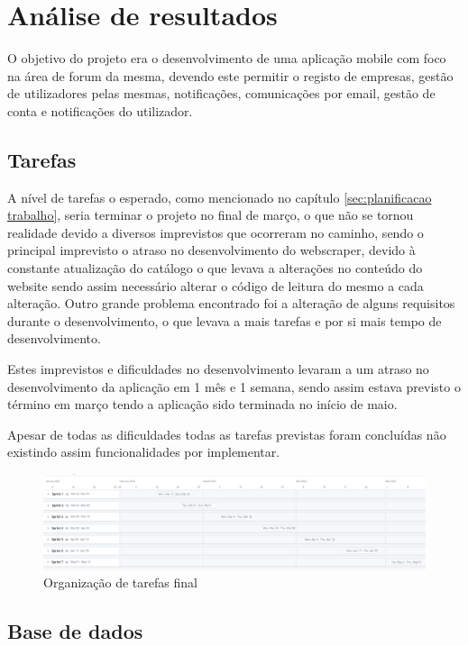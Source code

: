 \chapter{Análise de resultados}
 O objetivo do projeto era o desenvolvimento de uma aplicação mobile com foco na área de forum da mesma, devendo este permitir o registo de empresas, gestão de utilizadores pelas mesmas, notificações, comunicações por email, gestão de conta e notificações do utilizador.

 \section{Tarefas}

A nível de tarefas o esperado, como mencionado no capítulo \ref{sec:planificacao trabalho}, seria terminar o projeto no final de março, o que não se tornou realidade devido a diversos imprevistos que ocorreram no caminho, sendo o principal imprevisto o atraso no desenvolvimento do webscraper, devido à constante atualização do catálogo o que levava a alterações no conteúdo do website sendo assim necessário alterar o código de leitura do mesmo a cada alteração. Outro grande problema encontrado foi a alteração de alguns requisitos durante o desenvolvimento, o que levava a mais tarefas e por si mais tempo de desenvolvimento.

Estes imprevistos e dificuldades no desenvolvimento levaram a um atraso no desenvolvimento da aplicação em 1 mês e 1 semana, sendo assim estava previsto o término em março tendo a aplicação sido terminada no início de maio.

Apesar de todas as dificuldades todas as tarefas previstas foram concluídas não existindo assim funcionalidades por implementar.

\begin{figure}[htb]
  \centering
  \includegraphics[width=\textwidth]{images/analise_resultados/planeamento_final.png}
  \caption{Organização de tarefas final}
  \label{fig:77}
\end{figure}

\newpage

\section{Base de dados}


